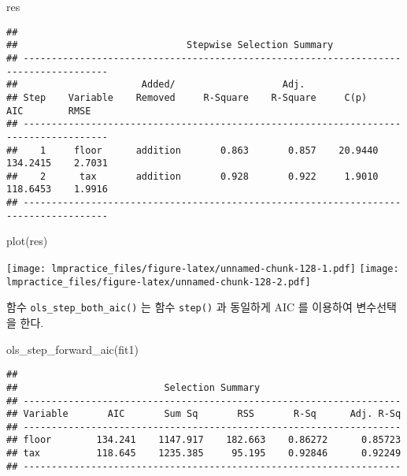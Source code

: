 \documentclass[
]{book}
\newenvironment{Shaded}{\begin{snugshade}}{\end{snugshade}}
\newcommand{\FunctionTok}[1]{\textcolor[rgb]{0.00,0.00,0.00}{#1}}
\newcommand{\NormalTok}[1]{#1}
\begin{document}
\begin{Shaded}
\begin{Highlighting}[]
\NormalTok{res}
\end{Highlighting}
\end{Shaded}

\begin{verbatim}
## 
##                              Stepwise Selection Summary                               
## -------------------------------------------------------------------------------------
##                      Added/                   Adj.                                       
## Step    Variable    Removed     R-Square    R-Square     C(p)        AIC        RMSE     
## -------------------------------------------------------------------------------------
##    1     floor      addition       0.863       0.857    20.9440    134.2415    2.7031    
##    2      tax       addition       0.928       0.922     1.9010    118.6453    1.9916    
## -------------------------------------------------------------------------------------
\end{verbatim}

\begin{Shaded}
\begin{Highlighting}[]
\FunctionTok{plot}\NormalTok{(res)}
\end{Highlighting}
\end{Shaded}

\texttt{[image: lmpractice\_files/figure-latex/unnamed-chunk-128-1.pdf]} \texttt{[image: lmpractice\_files/figure-latex/unnamed-chunk-128-2.pdf]}

함수 \texttt{ols\_step\_both\_aic()} 는 함수 \texttt{step()} 과 동일하게 AIC 를 이용하여 변수선택을 한다.

\begin{Shaded}
\begin{Highlighting}[]
\FunctionTok{ols\_step\_forward\_aic}\NormalTok{(fit1)}
\end{Highlighting}
\end{Shaded}

\begin{verbatim}
## 
##                          Selection Summary                          
## -------------------------------------------------------------------
## Variable       AIC       Sum Sq       RSS       R-Sq      Adj. R-Sq 
## -------------------------------------------------------------------
## floor        134.241    1147.917    182.663    0.86272      0.85723 
## tax          118.645    1235.385     95.195    0.92846      0.92249 
## -------------------------------------------------------------------
\end{verbatim}
\end{document}
